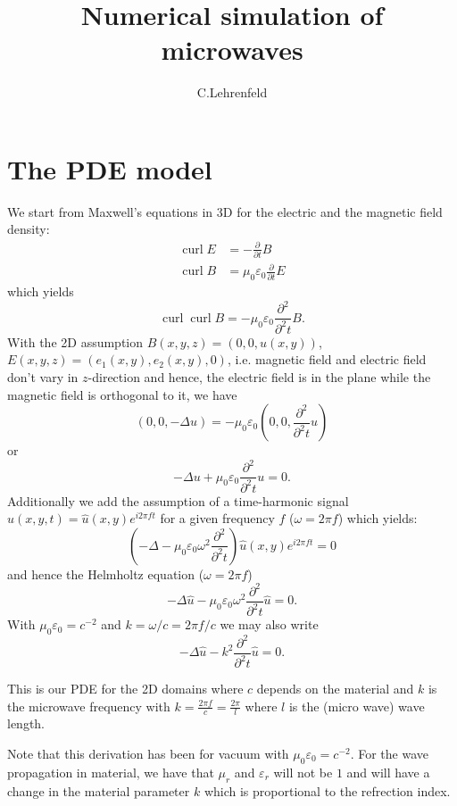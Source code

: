 \documentclass[a4paper,12pt]{paper}
\title{Numerical simulation of microwaves}
\author{C.Lehrenfeld}
\numberwithin{equation}{section}
\numberwithin{figure}{section}
\begin{document}
\maketitle

\section{The PDE model}
We start from Maxwell's equations in 3D for the electric and the magnetic field density:
\begin{subequations}\label{eq:prob_form1}
\begin{eqnarray}
  \operatorname{curl} E &= - \frac{\partial}{\partial t} B  \\ 
  \operatorname{curl} B &= \mu_0 \varepsilon_0 \frac{\partial}{\partial t} E
\end{eqnarray}
\end{subequations}
which yields
$$
\operatorname{curl} \operatorname{curl} B = - \mu_0 \varepsilon_0 \frac{\partial^2}{\partial^2 t} B.
$$
With the 2D assumption $B(x,y,z) = (0,0,u(x,y))$, $E(x,y,z) = (e_1(x,y),e_2(x,y),0)$, i.e. magnetic field and electric field don't vary in $z$-direction and hence, the electric field is in the plane while the magnetic field is orthogonal to it, we have 
$$
(0,0,-\Delta u) = - \mu_0 \varepsilon_0 (0,0,\frac{\partial^2}{\partial^2 t} u)
$$
or
$$
-\Delta u + \mu_0 \varepsilon_0 \frac{\partial^2}{\partial^2 t} u = 0.
$$
Additionally we add the assumption of a time-harmonic signal $u(x,y,t) = \hat{u}(x,y) e^{i 2\pi f t}$ for a given frequency $f$ ($\omega = 2 \pi f$) which yields:
$$
(- \Delta - \mu_0 \varepsilon_0 \omega^2 \frac{\partial^2}{\partial^2 t}) \hat u(x,y) e^{i 2 \pi f t} = 0
$$
and hence the Helmholtz equation ($\omega = 2 \pi f$)
$$
- \Delta \hat u - \mu_0 \varepsilon_0 \omega^2 \frac{\partial^2}{\partial^2 t} \hat u = 0.
$$
With $\mu_0 \varepsilon_0 = c^{-2}$ and $k = \omega/c = 2 \pi f/c$ we may also write
$$
- \Delta \hat u - k^2 \frac{\partial^2}{\partial^2 t} \hat u = 0.
$$

This is our PDE for the 2D domains where $c$ depends on the material and $k$ is the microwave frequency with $k = \frac{2 \pi f}{c} = \frac{2 \pi}{l}$ where $l$ is the (micro wave) wave length. 

Note that this derivation has been for vacuum with $\mu_0 \varepsilon_0 = c^{-2}$. For the wave propagation in material, we have that $\mu_r$ and $\varepsilon_r$ will not be $1$ and will have a change in the material parameter $k$ which is proportional to the refrection index.
\end{document}
